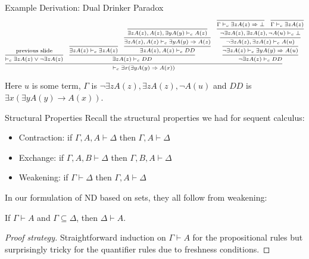 \documentclass[xcolor=dvipsnames,aspectratio=169,handout]{beamer}
\begin{document}
\begin{frame}{Example Derivation: Dual Drinker Paradox}
	$$
	\scriptsize
	\infer{\vdash_c \exists x(\exists yA(y)\to A(x))}{
	\infer{\vdash_c \exists z A(z)\lor\neg \exists z A(z)}{\text{previous slide}} &
	\infer{\exists z A(z) \vdash_c DD}{
	\infer{\exists z A(z) \vdash_c\exists z A(z) }{} &
	\infer{\exists z A(z), A(z)\vdash_c DD}{
	\infer{\exists z A(z), A(z)\vdash_c \exists yA(y)\to A(z)}{
	\infer{\exists z A(z), A(z), \exists yA(y) \vdash_c A(z)}{}
	}
	}
	}
	&
	\infer{\neg\exists z A(z) \vdash_c DD}{
	\infer{\neg\exists z A(z)\vdash_c \exists yA(y)\to A(u)}{
	\infer{\neg\exists z A(z),\exists z A(z)\vdash_c A(u)}{
	\infer{\neg\exists z A(z),\exists z A(z),\neg A(u)\vdash_c \bot}{
	\infer{\Gamma \vdash_c \exists z A(z) \to \bot}{} & \infer{\Gamma \vdash_c\exists z A(z) }{}
	}
	}
	}
	}
	}
	$$
	
	\vspace{0.5cm}
	Here $u$ is some term, $\Gamma$ is $\neg\exists z A(z),\exists z A(z),\neg A(u)$ and $DD$ is $\exists x(\exists yA(y)\to A(x))$.
\end{frame}

\begin{frame}{Structural Properties}
	Recall the structural properties we had for sequent calculus:
	\begin{itemize}
		\item
		Contraction: if $\Gamma,A,A\vdash \Delta$ then $\Gamma,A\vdash \Delta$
		\item
		Exchange: if $\Gamma,A,B\vdash\Delta$ then $\Gamma,B,A\vdash\Delta$
		\item
		Weakening: if $\Gamma\vdash\Delta$ then $\Gamma,A\vdash \Delta$
	\end{itemize}
	
	\pause
	
	\vspace{0.5cm}
	In our formulation of ND based on sets, they all follow from weakening:
	\vspace{0.5cm}
	\begin{lemma}
		If $\Gamma\vdash A$ and $\Gamma\subseteq \Delta$, then $\Delta\vdash A$.
	\end{lemma}
	\pause
	\begin{proof}[Proof strategy]
		Straightforward induction on $\Gamma\vdash A$ for the propositional rules but surprisingly tricky for the quantifier rules due to freshness conditions.
	\end{proof}
\end{frame}
\end{document}
